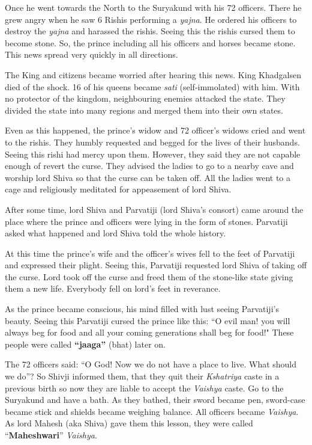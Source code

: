 Once he went towards the North to the Suryakund with his 72 officers. There he
grew angry when he saw 6 Rishis performing a \textit{yajna}. He ordered his
officers to destroy the \textit{yajna} and harassed the rishis. Seeing this the
rishis cursed them to become stone. So, the prince including all his officers
and horses became stone. This news spread very quickly in all directions.

The King and citizens became worried after hearing this news. King Khadgalsen
died of the shock. 16 of his queens became \textit{sati} (self-immolated) with
him. With no protector of the kingdom, neighbouring enemies attacked the state.
They divided the state into many regions and merged them into their own states.

Even as this happened, the prince's widow and 72 officer's widows cried and
went to the rishis. They humbly requested and begged for the lives of their
husbands. Seeing this rishi had mercy upon them. However, they said they are
not capable enough of revert the curse. They advised the ladies to go to a
nearby cave and worship lord Shiva so that the curse can be taken off. All the
ladies went to a cage and religiously meditated for appeasement of lord Shiva.

After some time, lord Shiva and Parvatiji (lord Shiva's consort) came around
the place where the prince and officers were lying in the form of stones.
Parvatiji asked what happened and lord Shiva told the whole history.

At this time the prince's wife and the officer's wives fell to the feet of
Parvatiji and expressed their plight. Seeing this, Parvatiji requested lord
Shiva of taking off the curse. Lord took off the curse and freed them of the
stone-like state giving them a new life. Everybody fell on lord's feet in
reverance.

As the prince became conscious, his mind filled with lust seeing Parvatiji's
beauty. Seeing this Parvatiji cursed the prince like this: ``O evil man! you
will always beg for food and all your coming generations shall beg for food!"
These people were called \textbf{``jaaga''} (bhat) later on.

The 72 officers said: ``O God! Now we do not have a place to live. What should
we do''? So Shivji informed them, that they quit their \textit{Kshatriya} caste
in a previous birth so now they are liable to accept the \textit{Vaishya}
caste. Go to the Suryakund and have a bath. As they bathed, their sword became
pen, sword-case became stick and shields became weighing balance. All officers
became \textit{Vaishya}. As lord Mahesh (aka Shiva) gave them this lesson, they
were called ``\textbf{Maheshwari}'' \textit{Vaishya}.

